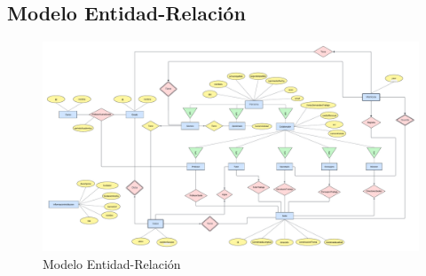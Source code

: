 \subsection{Modelo Entidad-Relación}
\begin{figure}[htp]
	\centering
	\includegraphics[width=\textwidth]{figures/modeloer.png}
	\caption{Modelo Entidad-Relación}
	\label{fig:my_label}
\end{figure}
